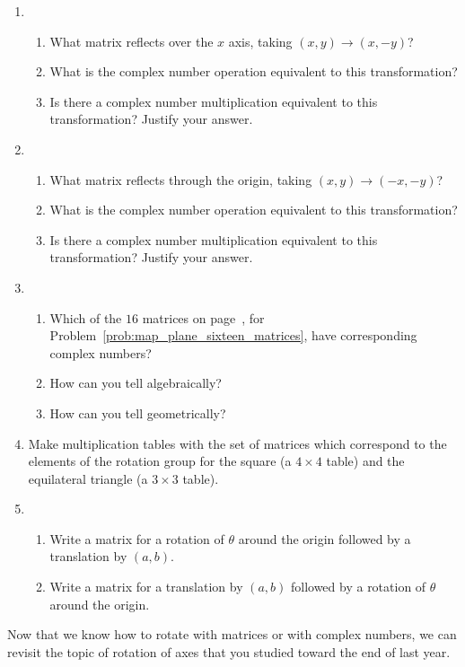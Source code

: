 \documentclass[../textbook.tex]{subfiles}
\begin{document}
\begin{enumerate}
\setcounter{enumi}{\value{problem_i}}
\item\begin{enumerate}
\item What matrix reflects over the $x$ axis, taking $(x,y)\to (x,-y)$?
\item What is the complex number operation equivalent to this transformation?
\item Is there a complex number multiplication equivalent to this transformation? Justify your answer.
\end{enumerate}
\item\begin{enumerate}
\item What matrix reflects through the origin, taking $(x,y)\to (-x,-y)$?
\item What is the complex number operation equivalent to this transformation?
\item Is there a complex number multiplication equivalent to this transformation? Justify your answer.
\end{enumerate}
\item \begin{enumerate}
\item Which of the $16$ matrices on page~\pageref{prob:map_plane_sixteen_matrices}, for Problem~\ref{prob:map_plane_sixteen_matrices}, have corresponding complex numbers?
\item How can you tell algebraically?
\item How can you tell geometrically?
\end{enumerate}
\item Make multiplication tables with the set of matrices which correspond to the elements of the rotation group for the square (a $4\times 4$ table) and the equilateral triangle (a $3\times 3$ table).
\item \begin{enumerate}
\item Write a matrix for a rotation of $\theta$ around the origin followed by a translation by $(a,b)$.
\item Write a matrix for a translation by $(a,b)$ followed by a rotation of $\theta$ around the origin.
\end{enumerate}
\setcounter{problem_i}{\value{enumi}}
\end{enumerate}

\noindent Now that we know how to rotate with matrices or with complex numbers, we can revisit the topic of rotation of axes that you studied toward the end of last year.
\end{document}
